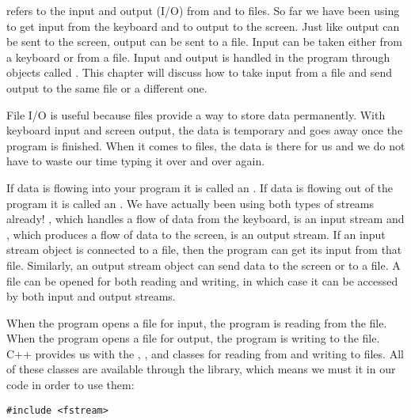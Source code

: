 
 refers to the input and output (I/O) from and to files. 
So far we have been using  to get input from the keyboard and  to output to the screen. 
Just like output can be sent to the screen, output can be sent to a file. 
Input can be taken either from a keyboard or from a file. 
Input and output is handled in the program through objects called . 
This chapter will discuss how to take input from a file and send output to the same file or a different one. 

File I/O is useful because files provide a way to store data permanently. 
With keyboard input and screen output, the data is temporary and goes away once the program is finished.
When it comes to files, the data is there for us and we do not have to waste our time typing it over and over again. 


If data is flowing into your program it is called an . 
If data is flowing out of the program it is called an . 
We have actually been using both types of streams already! 
, which handles a flow of data from the keyboard, is an input stream and , which produces a flow of data to the screen, is an output stream. 
If an input stream object is connected to a file, then the program can get its input from that file. 
Similarly, an output stream object can send data to the screen or to a file. 
A file can be opened for both reading and writing, in which case it can be accessed by both input and output streams.


When the program opens a file for input, the program is reading from the file. 
When the program opens a file for output, the program is writing to the file. 
C++ provides us with the , , and  classes for reading from and writing to files. 
All of these classes are available through the  library, which means we must  it in our code in order to use them:

\noindent\begin{minipage}{\linewidth}\begin{lstlisting}
#include <fstream>
\end{lstlisting}\end{minipage}

